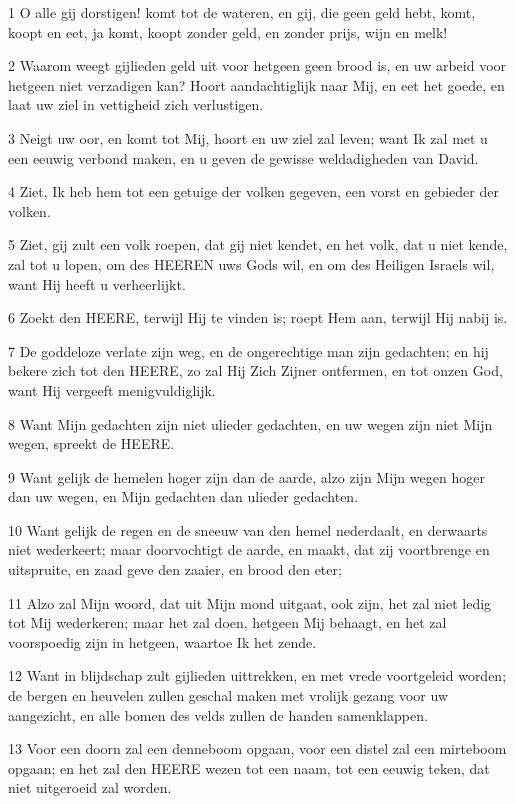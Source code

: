 \par 1 O alle gij dorstigen! komt tot de wateren, en gij, die geen geld hebt, komt, koopt en eet, ja komt, koopt zonder geld, en zonder prijs, wijn en melk!
\par 2 Waarom weegt gijlieden geld uit voor hetgeen geen brood is, en uw arbeid voor hetgeen niet verzadigen kan? Hoort aandachtiglijk naar Mij, en eet het goede, en laat uw ziel in vettigheid zich verlustigen.
\par 3 Neigt uw oor, en komt tot Mij, hoort en uw ziel zal leven; want Ik zal met u een eeuwig verbond maken, en u geven de gewisse weldadigheden van David.
\par 4 Ziet, Ik heb hem tot een getuige der volken gegeven, een vorst en gebieder der volken.
\par 5 Ziet, gij zult een volk roepen, dat gij niet kendet, en het volk, dat u niet kende, zal tot u lopen, om des HEEREN uws Gods wil, en om des Heiligen Israels wil, want Hij heeft u verheerlijkt.
\par 6 Zoekt den HEERE, terwijl Hij te vinden is; roept Hem aan, terwijl Hij nabij is.
\par 7 De goddeloze verlate zijn weg, en de ongerechtige man zijn gedachten; en hij bekere zich tot den HEERE, zo zal Hij Zich Zijner ontfermen, en tot onzen God, want Hij vergeeft menigvuldiglijk.
\par 8 Want Mijn gedachten zijn niet ulieder gedachten, en uw wegen zijn niet Mijn wegen, spreekt de HEERE.
\par 9 Want gelijk de hemelen hoger zijn dan de aarde, alzo zijn Mijn wegen hoger dan uw wegen, en Mijn gedachten dan ulieder gedachten.
\par 10 Want gelijk de regen en de sneeuw van den hemel nederdaalt, en derwaarts niet wederkeert; maar doorvochtigt de aarde, en maakt, dat zij voortbrenge en uitspruite, en zaad geve den zaaier, en brood den eter;
\par 11 Alzo zal Mijn woord, dat uit Mijn mond uitgaat, ook zijn, het zal niet ledig tot Mij wederkeren; maar het zal doen, hetgeen Mij behaagt, en het zal voorspoedig zijn in hetgeen, waartoe Ik het zende.
\par 12 Want in blijdschap zult gijlieden uittrekken, en met vrede voortgeleid worden; de bergen en heuvelen zullen geschal maken met vrolijk gezang voor uw aangezicht, en alle bomen des velds zullen de handen samenklappen.
\par 13 Voor een doorn zal een denneboom opgaan, voor een distel zal een mirteboom opgaan; en het zal den HEERE wezen tot een naam, tot een eeuwig teken, dat niet uitgeroeid zal worden.

